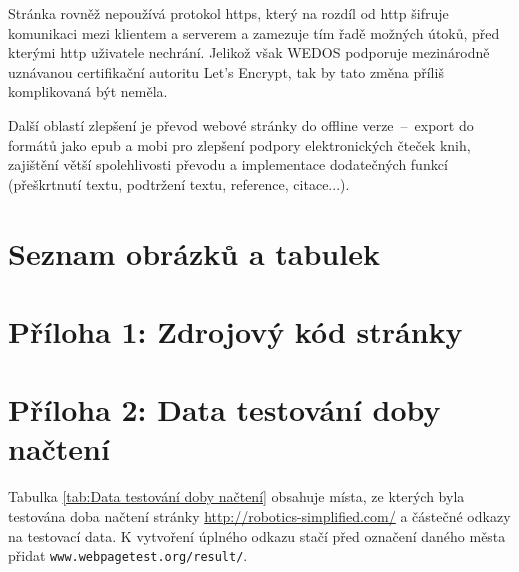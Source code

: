 \documentclass[a4paper, 12pt]{article}
\makeatletter
\renewcommand\listoffigures{%
    \@mkboth{\MakeUppercase\listfigurename}%
        {\MakeUppercase\listfigurename}%
    \@starttoc{lof}%
}
\renewcommand\listoftables{%
    \@mkboth{\MakeUppercase\listtablename}%
        {\MakeUppercase\listtablename}%
    \@starttoc{lot}%
}
\makeatother
\begin{document}
  Stránka rovněž nepoužívá protokol \gls{https}, který na rozdíl od \gls{http} šifruje komunikaci mezi klientem a serverem a zamezuje tím řadě možných útoků, před kterými \gls{http} uživatele nechrání. Jelikož však WEDOS podporuje mezinárodně uznávanou certifikační autoritu Let's Encrypt, tak by tato změna příliš komplikovaná být neměla.

  Další oblastí zlepšení je převod webové stránky do offline verze~--~export do formátů jako \gls{epub} a \gls{mobi} pro zlepšení podpory elektronických čteček knih, zajištění větší spolehlivosti převodu a implementace dodatečných funkcí (přeškrtnutí textu, podtržení textu, reference, citace...).


  \newpage

  \printbibliography[heading=bibnumbered, title=Použitá literatura]

  \newpage

  \section{Seznam obrázků a tabulek}
  {%
  \let\oldnumberline\numberline%
  \renewcommand{\numberline}{\figurename~\oldnumberline}%
  \listoffigures%
  }
  \vspace{\baselineskip}
  {%
  \let\oldnumberline\numberline%
  \renewcommand{\numberline}{\tablename~\oldnumberline}%
  \listoftables%
  }

  \newpage

  \section{Příloha 1: Zdrojový kód stránky} \label{sec:Příloha 1: Zdrojový kód webové stránky}

  \newpage

  \section{Příloha 2: Data testování doby načtení} \label{sec:Příloha 2: Data testování doby načtení}
  Tabulka \ref{tab:Data testování doby načtení} obsahuje místa, ze kterých byla testována doba načtení stránky \url{http://robotics-simplified.com/} a částečné odkazy na testovací data. K vytvoření úplného odkazu stačí před označení daného města přidat \texttt{www.webpagetest.org/result/}.
\end{document}
